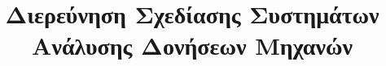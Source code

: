 \documentclass[masterthesis]{uthece-thesis}
\title{Διερεύνηση Σχεδίασης Συστημάτων Ανάλυσης Δονήσεων Μηχανών}
\begin{document}
\frontmatter
\maketitle


	\listoffigures %
%


\mainmatter
    
    
    
    
    
    
%


	



    

\ifgrthesisoption
    \renewcommand{\chaptername}{Παράρτημα}
\else
    \renewcommand{\chaptername}{Appendix}

\fi

   \renewcommand{\thechapter}{} 
   \renewcommand{\thesection}{\arabic{section}}

    

%
\end{document}
